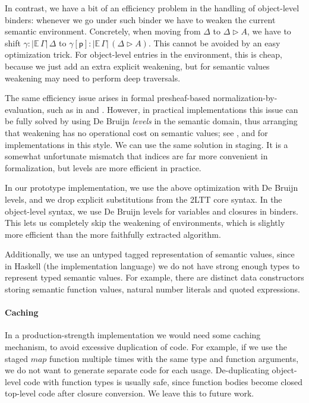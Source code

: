 \documentclass[acmsmall,screen]{acmart}
\newcommand{\mit}[1]{\mathit{#1}}
\newcommand{\mbb}[1]{\mathbb{#1}}
\newcommand{\ext}{\triangleright}
\newcommand{\p}{\mathsf{p}}
\newcommand{\ev}{\mbb{E}}
\theoremstyle{remark}
\begin{document}
In contrast, we have a bit of an efficiency problem in the handling of
object-level binders: whenever we go under such binder we have to weaken the
current semantic environment. Concretely, when moving from $\Delta$ to
$\Delta \ext A$, we have to shift $\gamma : |\ev\,\Gamma|\,\Delta$ to
$\gamma[\p] : |\ev\,\Gamma|\,(\Delta \ext A)$. This cannot be avoided by an easy
optimization trick. For object-level entries in the environment, this is cheap,
because we just add an extra explicit weakening, but for semantic values
weakening may need to perform deep traversals.

The same efficiency issue arises in formal presheaf-based
normalization-by-evaluation, such as in \cite{kaposinbe} and
\cite{coquand2018canonicity}. However, in practical implementations this issue
can be fully solved by using De Bruijn \emph{levels} in the semantic domain,
thus arranging that weakening has no operational cost on semantic values; see
\cite{coquand1996algorithm}, \cite{modulartc} and \cite{untypedtc} for
implementations in this style. We can use the same solution in staging. It is a
somewhat unfortunate mismatch that indices are far more convenient in
formalization, but levels are more efficient in practice.

In our prototype implementation, we use the above optimization with De Bruijn
levels, and we drop explicit substitutions from the 2LTT core syntax. In the
object-level syntax, we use De Bruijn levels for variables and closures in
binders. This lets us completely skip the weakening of environments, which is
slightly more efficient than the more faithfully extracted algorithm.

Additionally, we use an untyped tagged representation of semantic
values, since in Haskell (the implementation language) we do not have
strong enough types to represent typed semantic values. For example, there
are distinct data constructors storing semantic function values, natural number
literals and quoted expressions.

\paragraph{Caching} In a production-strength implementation we would need some
caching mechanism, to avoid excessive duplication of code. For example, if we
use the staged $\mit{map}$ function multiple times with the same type and
function arguments, we do not want to generate separate code for each
usage. De-duplicating object-level code with function types is usually safe,
since function bodies become closed top-level code after closure conversion. We
leave this to future work.
\end{document}
